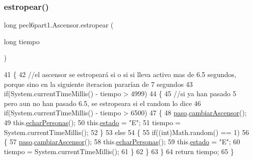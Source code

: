\subsubsection{\texorpdfstring{estropear()}{estropear()}}
{\footnotesize\ttfamily long pecl6part1.\+Ascensor.\+estropear (\begin{DoxyParamCaption}\item[{long}]{tiempo }\end{DoxyParamCaption})\hspace{0.3cm}{\ttfamily [inline]}}


\begin{DoxyCode}
41     \{
42         \textcolor{comment}{//el ascensor se estropeará si o si si lleva activo mas de 6.5 segundos, porque sino en la
       siguiente iteracion pararían de 7 segundos}
43         \textcolor{keywordflow}{if}(System.currentTimeMillis() - tiempo > 4999)
44         \{
45             \textcolor{comment}{//si ya han pasado 5 pero aun no han pasado 6.5,  se estropeara si el random lo dice}
46             \textcolor{keywordflow}{if}(System.currentTimeMillis() - tiempo > 6500)
47             \{
48                 \mbox{\hyperlink{classpecl6part1_1_1_ascensor_ae7416511a25816c86095a3f91915af06}{paso}}.\mbox{\hyperlink{classpecl6part1_1_1_monitor_af73b7d642935a50f59404c7e74e3830a}{cambiarAscensor}}();
49                 this.\mbox{\hyperlink{classpecl6part1_1_1_ascensor_acb83d6d5b2a100ea201f54e332476cda}{echarPersonas}}();
50                 this.\mbox{\hyperlink{classpecl6part1_1_1_ascensor_ad892045a12a5bfbd5b352fede74a1d0f}{estado}} = \textcolor{stringliteral}{"E"};
51                 tiempo = System.currentTimeMillis();
52             \}
53             \textcolor{keywordflow}{else}
54             \{
55                 \textcolor{keywordflow}{if}((\textcolor{keywordtype}{int})Math.random() == 1)
56                 \{
57                     \mbox{\hyperlink{classpecl6part1_1_1_ascensor_ae7416511a25816c86095a3f91915af06}{paso}}.\mbox{\hyperlink{classpecl6part1_1_1_monitor_af73b7d642935a50f59404c7e74e3830a}{cambiarAscensor}}();
58                     this.\mbox{\hyperlink{classpecl6part1_1_1_ascensor_acb83d6d5b2a100ea201f54e332476cda}{echarPersonas}}();
59                     this.\mbox{\hyperlink{classpecl6part1_1_1_ascensor_ad892045a12a5bfbd5b352fede74a1d0f}{estado}} = \textcolor{stringliteral}{"E"};
60                     tiempo = System.currentTimeMillis();
61                 \}
62             \}
63         \}
64         \textcolor{keywordflow}{return} tiempo;
65     \}
\end{DoxyCode}
\mbox{\label{classpecl6part1_1_1_ascensor_a20b3535c570b0277099d3744c474f44e}} 
